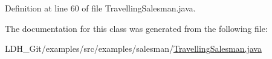 Definition at line 60 of file Travelling\-Salesman.\-java.



The documentation for this class was generated from the following file\-:\begin{DoxyCompactItemize}
\item 
L\-D\-H\-\_\-\-Git/examples/src/examples/salesman/\hyperlink{_travelling_salesman_8java}{Travelling\-Salesman.\-java}\end{DoxyCompactItemize}
